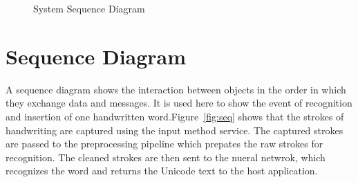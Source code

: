 \documentclass[12pt,a4paper]{report}
\begin{document}

\begin{figure}[!ht]
\centering
{}
\caption{System Sequence Diagram}\label{fig:ssd}
\end{figure}

\section{Sequence Diagram}
A sequence diagram shows the interaction between objects in the order in which they exchange data and messages. It is used here to show the event of recognition and insertion of one handwritten word.Figure~\ref{fig:seq} shows that the strokes of handwriting are captured using the input method service. The captured strokes are passed to the preprocessing pipeline which prepates the raw strokes for recognition. The cleaned strokes are then sent to the nueral netwrok, which recognizes the word and returns the Unicode text to the host application.
\end{document}
